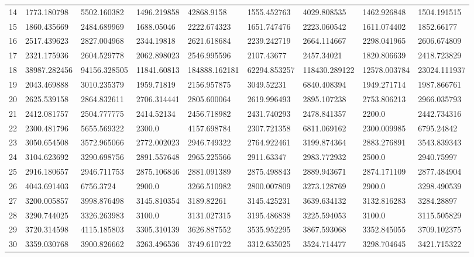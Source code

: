 \begin{table*}[t]
\begin{tabular}{|p{0.8cm}|p{1.6cm}|p{1.6cm}|p{1.6cm}|p{1.6cm}|p{1.6cm}|p{1.6cm}|p{1.6cm}|p{1.6cm}|}
14  & 1773.180798 & 5502.160382 & 1496.219858 & 42868.9158 & 1555.452763 & 4029.808535 & 1462.926848 & 1504.191515 \\ 
15  & 1860.435669 & 2484.689969 & 1688.05046 & 2222.674323 & 1651.747476 & 2223.060542 & 1611.074402 & 1852.66177 \\ 
16  & 2517.439623 & 2827.004968 & 2344.19818 & 2621.618684 & 2239.242719 & 2664.114667 & 2298.041965 & 2606.674809 \\ 
17  & 2321.175936 & 2604.529778 & 2062.898023 & 2546.995596 & 2107.43677 & 2457.34021 & 1820.806639 & 2418.723829 \\ 
18  & 38987.282456 & 94156.328505 & 11841.60813 & 184888.162181 & 62294.853257 & 118430.289122 & 12578.003784 & 23024.111937 \\ 
19  & 2043.469888 & 3010.235379 & 1959.71819 & 2156.957875 & 3049.52231 & 6840.408394 & 1949.271714 & 1987.866761 \\ 
20  & 2625.539158 & 2864.832611 & 2706.314441 & 2805.600064 & 2619.996493 & 2895.107238 & 2753.806213 & 2966.035793 \\ 
21  & 2412.081757 & 2504.777775 & 2414.52134 & 2456.718982 & 2431.740293 & 2478.841357 & 2200.0 & 2442.734316 \\ 
22  & 2300.481796 & 5655.569322 & 2300.0 & 4157.698784 & 2307.721358 & 6811.069162 & 2300.009985 & 6795.24842 \\ 
23  & 3050.654508 & 3572.965066 & 2772.002023 & 2946.749322 & 2764.922461 & 3199.874364 & 2883.276891 & 3543.839343 \\ 
24  & 3104.623692 & 3290.698756 & 2891.557648 & 2965.225566 & 2911.63347 & 2983.772932 & 2500.0 & 2940.75997 \\ 
25  & 2916.180657 & 2946.711753 & 2875.106846 & 2881.091389 & 2875.498843 & 2889.943671 & 2874.171109 & 2877.484904 \\ 
26  & 4043.691403 & 6756.3724 & 2900.0 & 3266.510982 & 2800.007809 & 3273.128769 & 2900.0 & 3298.490539 \\ 
27  & 3200.005857 & 3998.876498 & 3145.810354 & 3189.82261 & 3145.425231 & 3639.634132 & 3132.816283 & 3284.28897 \\ 
28  & 3290.744025 & 3326.263983 & 3100.0 & 3131.027315 & 3195.486838 & 3225.594053 & 3100.0 & 3115.505829 \\ 
29  & 3720.314598 & 4115.185803 & 3305.310139 & 3626.887552 & 3535.952295 & 3867.593068 & 3352.845055 & 3709.102375 \\ 
30  & 3359.030768 & 3900.826662 & 3263.496536 & 3749.610722 & 3312.635025 & 3524.714477 & 3298.704645 & 3421.715322 \\ 
\hline
\end{tabular}
\end{table*}
\endgroup


